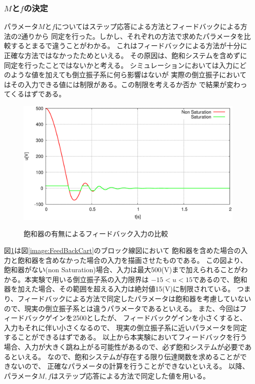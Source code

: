	\subsubsection{$M$と$f$の決定}
	パラメータ$M$と$f$についてはステップ応答による方法とフィードバックによる方法の2通りから
	同定を行った。しかし、それぞれの方法で求めたパラメータを比較するとまるで違うことがわかる。
	これはフィードバックによる方法が十分に正確な方法ではなかったためといえる。
	その原因は、飽和システムを含めずに同定を行ったことではないかと考える。
	シミュレーションにおいては入力にどのような値を加えても倒立振子系に何ら影響はないが
	実際の倒立振子においてはその入力できる値には制限がある。この制限を考えるか否か
	で結果が変わってくるはずである。
	\begin{figure}[H]
		\centering
		\includegraphics[width=0.8\linewidth]{gazo/feedback_input.eps}\\
		\caption{飽和器の有無によるフィードバック入力の比較}
		\label{image:feedback_saturation}
	\end{figure}
	図\ref{image:feedback_saturation}は図\ref{image:FeedBackCart}のブロック線図において
	飽和器を含めた場合の入力と飽和器を含めなかった場合の入力を描画させたものである。
	この図より、飽和器がない(non Saturation)場合、入力は最大500(V)まで加えられることがわかる。本実験で用いる倒立振子系の入力限界は
	$-15<u<15$であるので、飽和器を加えた場合、その範囲を超える入力は絶対値15(V)に制限されている。
	つまり、フィードバックによる方法で同定したパラメータは飽和器を考慮していないので、現実の倒立振子系とは違うパラメータであるといえる。
	また、今回はフィードバックゲインを2500としたが、
	フィードバックゲインを小さくすると、入力もそれに伴い小さくなるので、
	現実の倒立振子系に近いパラメータを同定することができるはずである。
	以上から本実験においてフィードバックを行う場合、入力が大きく跳ね上がる可能性があるので、必ず飽和システムが必要であるといえる。
	なので、飽和システムが存在する限り伝達関数を求めることができないので、
	正確なパラメータの計算を行うことができないといえる。
	以降、パラメータ$M,f$はステップ応答による方法で同定した値を用いる。
	
